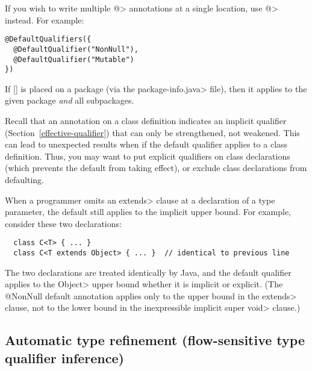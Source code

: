 If you wish to write multiple
\<@> annotations at a single location,
use
\<@> instead.  For example:

\begin{Verbatim}
@DefaultQualifiers({
  @DefaultQualifier("NonNull"),
  @DefaultQualifier("Mutable")
})
\end{Verbatim}


If [] is placed on a package (via the
\<package-info.java> file), then it applies to the given package \emph{and}
all subpackages.

Recall that an annotation on a class definition indicates an implicit
qualifier (Section~\ref{effective-qualifier}) that can only be
strengthened, not weakened.  This can lead to unexpected results when if
the default qualifier applies to a class definition.  Thus, you may want to
put explicit qualifiers on class declarations (which prevents the default
from taking effect), or exclude class declarations from defaulting.




When a programmer omits an \<extends> clause at a declaration of a type
parameter, the default still applies to the implicit upper bound.  For
example, consider these two declarations:

\begin{Verbatim}
  class C<T> { ... }
  class C<T extends Object> { ... }  // identical to previous line
\end{Verbatim}

\noindent
The two declarations are treated identically by Java, and the default
qualifier applies to the \<Object> upper bound whether it is implicit or
explicit.  (The @NonNull default annotation applies only to the upper bound
in the \<extends> clause, not to the lower bound in the inexpressible
implicit \<super void> clause.)



\subsection{Automatic type refinement (flow-sensitive type qualifier inference)\label{type-refinement}}

